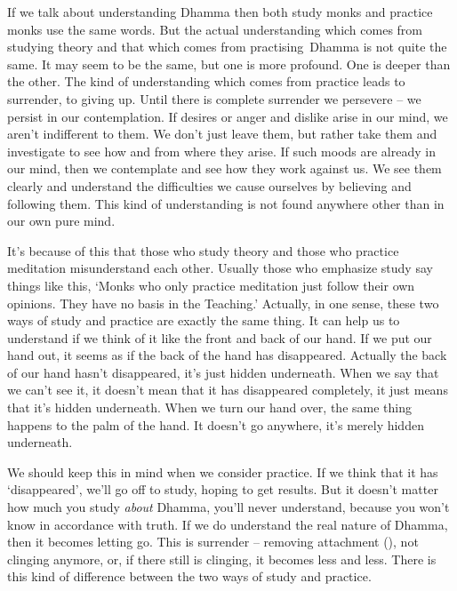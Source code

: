 If we talk about understanding Dhamma then both study monks and practice monks use the same words. But the actual understanding which comes from studying theory and that which comes from practising\linebreak\ Dhamma is not quite the same. It may seem to be the same, but one is more profound. One is deeper than the other. The kind of understanding which comes from practice leads to surrender, to giving up. Until there is complete surrender we persevere -- we persist in our contemplation. If desires or anger and dislike arise in our mind, we aren't indifferent to them. We don't just leave them, but rather take them and investigate to see how and from where they arise. If such moods are already in our mind, then we contemplate and see how they work against us. We see them clearly and understand the difficulties we cause ourselves by believing and following them. This kind of understanding is not found anywhere other than in our own pure mind. 

It's because of this that those who study theory and those who practice meditation misunderstand each other. Usually those who emphasize study say things like this, `Monks who only practice meditation just follow their own opinions. They have no basis in the Teaching.' Actually, in one sense, these two ways of study and practice are exactly the same thing. It can help us to understand if we think of it like the front and back of our hand. If we put our hand out, it seems as if the back of the hand has disappeared. Actually the back of our hand hasn't disappeared, it's just hidden underneath. When we say that we can't see it, it doesn't mean that it has disappeared completely, it just means that it's hidden underneath. When we turn our hand over, the same thing happens to the palm of the hand. It doesn't go anywhere, it's merely hidden underneath. 

We should keep this in mind when we consider practice. If we think that it has `disappeared', we'll go off to study, hoping to get results. But it doesn't matter how much you study \textit{about} Dhamma, you'll never understand, because you won't know in accordance with truth. If we do understand the real nature of Dhamma, then it becomes letting go. This is surrender -- removing attachment (), not clinging anymore, or, if there still is clinging, it becomes less and less. There is this kind of difference between the two ways of study and practice. 

